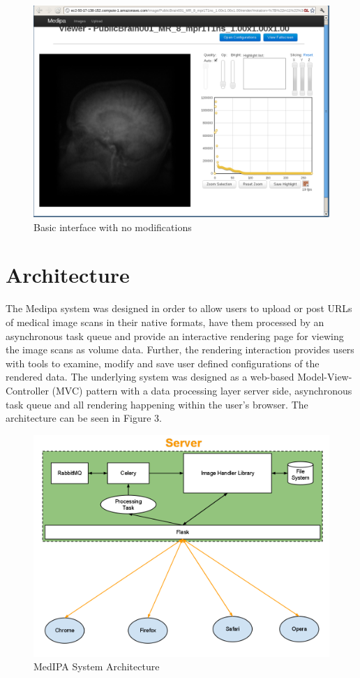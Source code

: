 \documentclass[annual]{acmsiggraph}
\begin{document}
\begin{figure}[htb]
	\includegraphics[scale=0.475]{clean_interface.png}
	\caption{\label{fig:head}Basic interface with no modifications}
\end{figure}

\section{Architecture}
	The Medipa system was designed in order to allow users to upload or post URLs of medical image scans in their native formats, have them processed by an asynchronous task queue and provide an interactive rendering page for viewing the image scans as volume data.  Further, the rendering interaction provides users with tools to examine, modify and save user defined configurations of the rendered data.  The underlying system was designed as a web-based Model-View-Controller (MVC) pattern with a data processing layer server side, asynchronous task queue and all rendering happening within the user's browser.  The architecture can be seen in Figure 3.

\begin{figure}[htb]
	\includegraphics[scale=0.475]{architecture.png}
	\caption{\label{fig:head}MedIPA System Architecture}
\end{figure}
\end{document}
